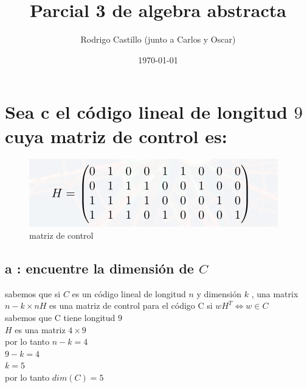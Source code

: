\documentclass[10pt,a4paper]{article} %
\begin{document}
    \title{{  Parcial 3 de algebra abstracta  }}
    \author{{Rodrigo Castillo (junto a Carlos y Oscar)}}
    \date{\today}

    \maketitle


    \section{Sea c el código lineal de longitud $9$ cuya matriz de control es:}
    \begin{figure}[h!]
        \centering
        \includegraphics[width=0.8\linewidth]{matrizcontrol.png}
        \caption{matriz de control}
        \label{matriz de control}
    \end{figure}

        \subsection{a : encuentre la dimensión de $C$}
        sabemos que si $C$ es un código lineal de longitud $n$ y dimensión $k$
        , una matrix $n-k \times  nH$ es una matriz de control para el código C
        si $wH ^{T} \iff w \in C $
        \\
        sabemos que C tiene longitud $9$
        \\
        $H$ es una matriz $4 \times 9$
        \\
        por lo tanto $n-k = 4$
        \\
        $9-k = 4$
        \\
        $k=5$
        \\
        por lo tanto $dim(C) = 5$

\end{document}
